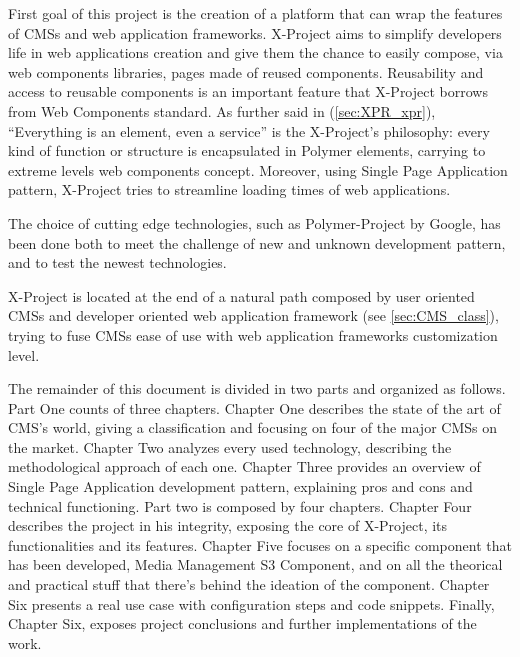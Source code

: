 First goal of this project is the creation of a platform that can wrap the features of CMSs and web application frameworks. 
X-Project aims to simplify developers life in web applications creation and give them the chance to easily compose, via web components libraries, pages made of reused components.
Reusability and access to reusable components is an important feature that X-Project borrows from Web Components standard.
As further said in (\ref{sec:XPR_xpr}), ``Everything is an element, even a service'' is the X-Project's philosophy: every kind of function or structure is encapsulated in Polymer elements, carrying to extreme levels web components concept. 
Moreover, using Single Page Application pattern, X-Project tries to streamline loading times of web applications.

The choice of cutting edge technologies, such as Polymer-Project by Google, has been done both to meet the challenge of new and unknown development pattern, and to test the newest technologies.

X-Project is located at the end of a natural path composed by user oriented CMSs and developer oriented web application framework (see \ref{sec:CMS_class}), trying to fuse CMSs ease of use with web application frameworks customization level.

The remainder of this document is divided in two parts and organized as follows. Part One counts of three chapters. Chapter One describes the state of the art of CMS's world, giving a classification and focusing on four of the major CMSs on the market. Chapter Two analyzes every used technology, describing the methodological approach of each one. Chapter Three provides an overview of Single Page Application development pattern, explaining pros and cons and technical functioning.
Part two is composed by four chapters. Chapter Four describes the project in his integrity, exposing the core of X-Project, its functionalities and its features.
Chapter Five focuses on a specific component that has been developed, Media Management S3 Component, and on all the theorical and practical stuff that there's behind the ideation of the component. Chapter Six presents a real use case with configuration steps and code snippets.
Finally, Chapter Six, exposes project conclusions and further implementations of the work.



